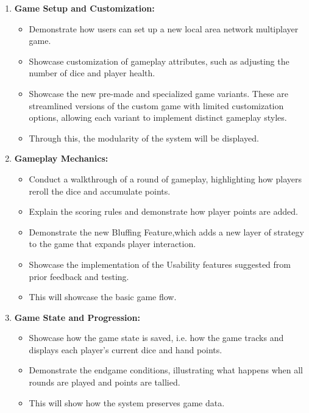 \documentclass{article}
\begin{document}
\begin{enumerate}
    \item \textbf{Game Setup and Customization:}
    \begin{itemize}
        \item Demonstrate how users can set up a new local area network multiplayer game.
        \item Showcase customization of gameplay attributes, such as adjusting the number of dice and player health.
    		\item Showcase the new pre-made and specialized game variants. These are streamlined versions of the custom game with limited customization options, allowing each variant to implement distinct gameplay styles. 
        \item Through this, the modularity of the system will be displayed.
    \end{itemize}
    
    \item \textbf{Gameplay Mechanics:}
    \begin{itemize}
        \item Conduct a walkthrough of a round of gameplay, highlighting how players reroll the dice and accumulate points.
        \item Explain the scoring rules and demonstrate how player points are added.
        \item Demonstrate the new Bluffing Feature,which adds a new layer of strategy to the game that expands player interaction.
        \item Showcase the implementation of the Usability features suggested from prior feedback and testing.
        \item This will showcase the basic game flow.
        
    \end{itemize}
    
    \item \textbf{Game State and Progression:}
    \begin{itemize}
        \item Showcase how the game state is saved, i.e. how the game tracks and displays each player's current dice and hand points.
        \item Demonstrate the endgame conditions, illustrating what happens when all rounds are played and points are tallied.
        \item This will show how the system preserves game data.
    \end{itemize}
    

\end{enumerate}
\end{document}
